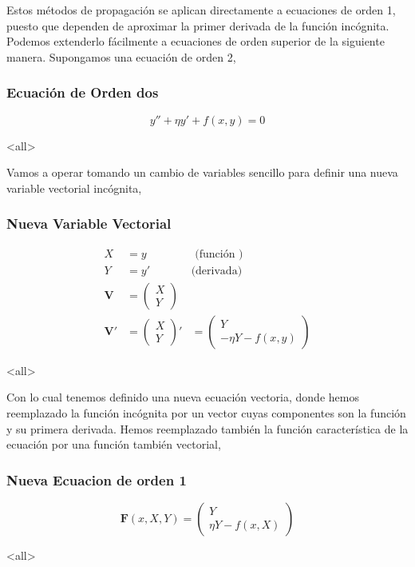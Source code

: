 Estos métodos de propagación se aplican directamente a ecuaciones de orden 1,
puesto que dependen de aproximar la primer derivada de la función incógnita. 
Podemos extenderlo fácilmente a ecuaciones de orden superior de la siguiente manera.
Supongamos una ecuación de orden 2, 
\mode*
\begin{frame}[label=FrameEcuacionOrden2]
  \frametitle<presentation>{Ecuación de Orden dos}
  \begin{equation}
    y'' + \eta y' + f(x, y) = 0
  \end{equation}
\end{frame}
\mode<all>

Vamos a operar tomando un cambio de variables sencillo para definir una nueva variable vectorial 
incógnita, 
\mode*
\begin{frame}[label=FrameVariableVectorial]
  \frametitle<presentation>{Nueva Variable Vectorial}
  \begin{equation}
    \begin{aligned}
      X &= y &\text{ (función ) } \\
      Y &= y' &\text{(derivada) }\\
      \mathbf{V} &= \begin{pmatrix} X \\ Y  \end{pmatrix} \\
	\mathbf{V'} &=  \begin{pmatrix} X \\ Y  \end{pmatrix}' &= 
	  \begin{pmatrix}   Y \\ -\eta Y - f(x, y)  \end{pmatrix}
    \end{aligned}
  \end{equation}
\end{frame}
\mode<all>

Con lo cual tenemos definido una nueva ecuación vectoria, donde hemos reemplazado 
la función incógnita por un vector cuyas componentes son la función y su primera 
derivada. Hemos reemplazado también la función característica de la ecuación por una
función también vectorial, 

\mode*
\begin{frame}[label=FrameEcuacionOrdenSuparior]
  \frametitle<presentation>{Nueva Ecuacion de orden 1}
  \begin{equation}
    \mathbf{F}(x, X, Y) = \begin{pmatrix} Y\\ \eta Y - f(x, X)   \end{pmatrix}
  \end{equation}
\end{frame}
\mode<all>

